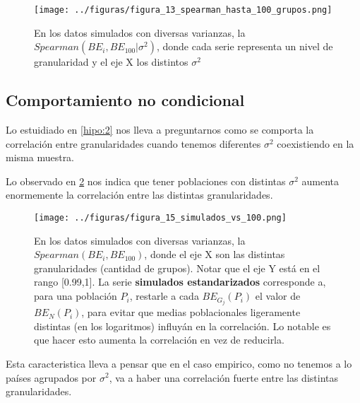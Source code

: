 \begin{figure}[H]
    \centering 
    \texttt{[image: ../figuras/figura\_13\_spearman\_hasta\_100\_grupos.png]} 
    \caption{En los datos simulados con diversas varianzas, la $Spearman(BE_i,BE_{100} | \sigma^2)$, donde cada serie representa un nivel de granularidad y el eje X los distintos $\sigma^2$}
    \label{fig:13}
\end{figure}



\subsection{Comportamiento no condicional}

Lo estuidiado en \ref{hipo:2} nos lleva a preguntarnos como se comporta la correlación entre granularidades cuando tenemos diferentes $\sigma^2$ coexistiendo en la misma muestra.

Lo observado en \ref{fig:15} nos indica que tener poblaciones con distintas $\sigma^2$ aumenta enormemente la correlación entre las distintas granularidades.

\begin{figure}[H]
    \centering 
    \texttt{[image: ../figuras/figura\_15\_simulados\_vs\_100.png]} 
    \caption{En los datos simulados con diversas varianzas, la $Spearman(BE_i,BE_{100})$, donde el eje X son las distintas granularidades (cantidad de grupos). Notar que el eje Y está en el rango [0.99,1]. La serie \textbf{simulados estandarizados} corresponde a, para una población $P_i$, restarle a cada $BE_{G_j}(P_i)$ el valor de $BE_N(P_i)$, para evitar que medias poblacionales ligeramente distintas (en los logaritmos) influyán en la correlación. Lo notable es que hacer esto aumenta la correlación en vez de reducirla.}
    \label{fig:15}
\end{figure}

Esta caracteristica lleva a pensar que en el caso empirico, como no tenemos a lo países agrupados por $\sigma^2$, va a haber una correlación fuerte entre las distintas granularidades. 